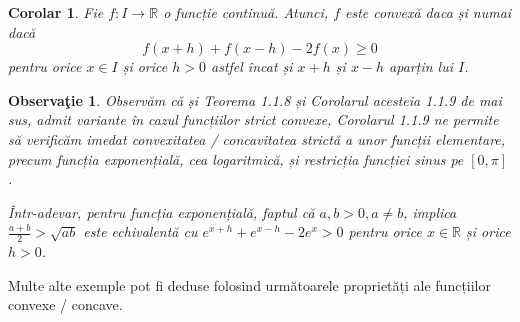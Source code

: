 \documentclass[a4paper,12pt,oneside]{report}
\newtheorem{remark}{Observa\c{t}ie}
\newtheorem{corollary}{Corolar}
\begin{document}
\begin{corollary}
Fie \(f: I \rightarrow \mathbb{R}\) o funcție continuă. Atunci, \(f\) este convexă daca și numai dacă
\begin{displaymath}
  f\left ( x+h \right )+ f\left ( x - h \right ) - 2f\left ( x \right )\geq 0
\end{displaymath}
pentru orice \(x \in I\) și orice \(h > 0\) astfel încat și \(x + h\) și \(x - h\) aparțin lui \(I\).
\end{corollary}
\begin{remark}
Observăm că și Teorema 1.1.8 și Corolarul acesteia 1.1.9 de mai sus, admit variante în cazul funcțiilor strict convexe,
Corolarul 1.1.9 ne permite să verificăm imedat convexitatea / concavitatea strictă a unor funcții elementare, precum funcția exponențială, cea logaritmică, și restricția funcției sinus pe \(\left [ 0 , \pi \right ]\).

Într-adevar, pentru funcția exponențială, faptul că  \(a , b > 0, a\neq b\), implica \(\frac{a + b}{2}> \sqrt{ab}\)
este echivalentă cu
\(e^{x + h} + e^{x - h } - 2e^{x}> 0\)
pentru orice \(x\in \mathbb{R}\) și orice \(h > 0\).
\end{remark}
	Multe alte exemple pot fi deduse folosind următoarele proprietăți ale funcțiilor convexe / concave.
\end{document}
